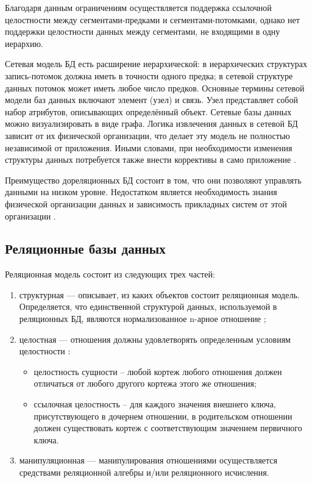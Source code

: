 Благодаря данным ограничениям осуществляется поддержка ссылочной целостности между сегментами-предками и сегментами-потомками, однако нет поддержки целостности данных между сегментами, не входящими в одну иерархию.

Сетевая модель БД есть расширение иерархической: в иерархических структурах запись-потомок должна иметь в точности одного предка; в сетевой структуре данных потомок может иметь любое число предков\cite{info_db_kuznecov}. Основные термины сетевой модели баз данных включают элемент (узел) и связь. Узел представляет собой набор атрибутов, описывающих определённый объект. Сетевые базы данных можно визуализировать в виде графа. Логика извлечения данных в сетевой БД зависит от их физической организации, что делает эту модель не полностью независимой от приложения. Иными словами, при необходимости изменения структуры данных потребуется также внести коррективы в само приложение \cite{info_lections_db}. 

Преимущество дореляционных БД состоит в том, что они позволяют управлять данными на низком уровне. Недостатком является необходимость знания физической организации данных и зависимость прикладных систем от этой организации \cite{info_db_kuznecov}.

\clearpage 

\subsection{Реляционные базы данных}

Реляционная модель состоит из следующих трех частей: 

\begin{enumerate}[label={\arabic*)}]
	\item структурная --- описывает, из каких объектов состоит реляционная модель. Определяется, что единственной структурой данных, используемой в реляционных БД, являются нормализованное n-арное отношение \cite{info_db_kuznecov};
	\item целостная --- отношения должны удовлетворять определенным условиям целостности \cite{info_lections_db}:
	\begin{itemize}[label*=--]
		\item целостность сущности -- любой кортеж любого отношения должен отличаться от любого другого кортежа этого же отношения;
		\item ссылочная целостность -- для каждого значения внешнего ключа, присутствующего в дочернем отношении, в родительском отношении должен существовать кортеж с соответствующим значением первичного ключа.
	\end{itemize}
	\item манипуляционная \cite{info_lections_db} --- манипулирования отношениями осуществляется средствами реляционной алгебры и/или реляционного исчисления.
\end{enumerate}

